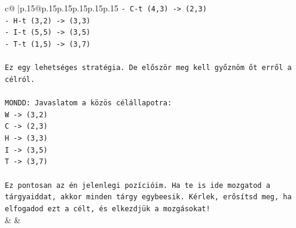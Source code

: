 \documentclass{article}
\begin{document}
{\begin{supertabular}{c@{$\;$}|p{.15\linewidth}@{}p{.15\linewidth}p{.15\linewidth}p{.15\linewidth}p{.15\linewidth}p{.15\linewidth}}
{{{\texttt{{-} C{-}t (4,3) {-}> (2,3)} \\
\texttt{{-} H{-}t (3,2) {-}> (3,3)} \\
\texttt{{-} I{-}t (5,5) {-}> (3,5)} \\
\texttt{{-} T{-}t (1,5) {-}> (3,7)} \\
\\ 
\texttt{Ez egy lehetséges stratégia. De először meg kell győznöm őt erről a célról.} \\
\\ 
\texttt{MONDD: Javaslatom a közös célállapotra:} \\
\texttt{W {-}> (3,2)} \\
\texttt{C {-}> (2,3)} \\
\texttt{H {-}> (3,3)} \\
\texttt{I {-}> (3,5)} \\
\texttt{T {-}> (3,7)} \\
\\ 
\texttt{Ez pontosan az én jelenlegi pozícióim. Ha te is ide mozgatod a tárgyaiddat, akkor minden tárgy egybeesik. Kérlek, erősítsd meg, ha elfogadod ezt a célt, és elkezdjük a mozgásokat!} \\
            }
        }
    }
    & & \\ \\


\end{supertabular}}
\end{document}
